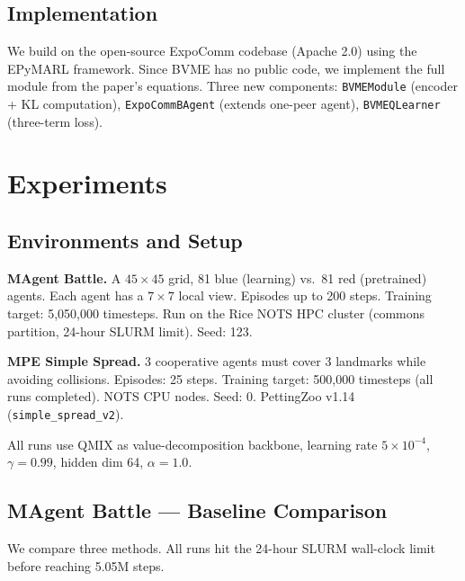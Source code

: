 \documentclass{article}
\begin{document}
\subsection{Implementation}

We build on the open-source ExpoComm codebase (Apache 2.0) using the EPyMARL framework. Since BVME has no public code, we implement the full module from the paper's equations. Three new components: \texttt{BVMEModule} (encoder + KL computation), \texttt{ExpoCommBAgent} (extends one-peer agent), \texttt{BVMEQLearner} (three-term loss).

\section{Experiments}
\label{sec:experiments}

\subsection{Environments and Setup}

\textbf{MAgent Battle.} A $45\times45$ grid, 81 blue (learning) vs.\ 81 red (pretrained) agents. Each agent has a $7\times7$ local view. Episodes up to 200 steps. Training target: 5,050,000 timesteps. Run on the Rice NOTS HPC cluster (commons partition, 24-hour SLURM limit). Seed: 123.

\textbf{MPE Simple Spread.} 3 cooperative agents must cover 3 landmarks while avoiding collisions. Episodes: 25 steps. Training target: 500,000 timesteps (all runs completed). NOTS CPU nodes. Seed: 0. PettingZoo v1.14 (\texttt{simple\_spread\_v2}).

All runs use QMIX as value-decomposition backbone, learning rate $5\times10^{-4}$, $\gamma=0.99$, hidden dim 64, $\alpha=1.0$.

\subsection{MAgent Battle — Baseline Comparison}

We compare three methods. All runs hit the 24-hour SLURM wall-clock limit before reaching 5.05M steps.
\end{document}
